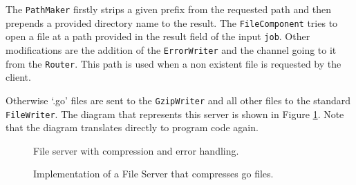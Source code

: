 The \texttt{PathMaker} firstly strips a given
prefix from the requested path and then prepends a provided directory name to 
the result. The \texttt{FileComponent} tries to open a file at a path 
provided in the result field of the input \texttt{job}. Other modifications
are the addition of the \texttt{ErrorWriter} and the channel going to it from
the \texttt{Router}.
This path is used when a non existent file is requested by the client.

Otherwise `.go' files are sent to the \texttt{GzipWriter} and all other files to 
the standard \texttt{FileWriter}.
The diagram that represents this server is shown in 
Figure \ref{fig:fileServer3}. Note that the diagram translates directly 
to program code again.

\begin{figure}[h]
\centering
{}
\caption[scale=1.0]{File server with compression and error handling.}
\label{fig:fileServer3}
\end{figure}

\begin{figure}
\vspace{-1cm}

\caption[scale=1.0]{Implementation of a File Server that compresses go files.}
\label{fig:FileServerImpl}
\end{figure}

\newpage
